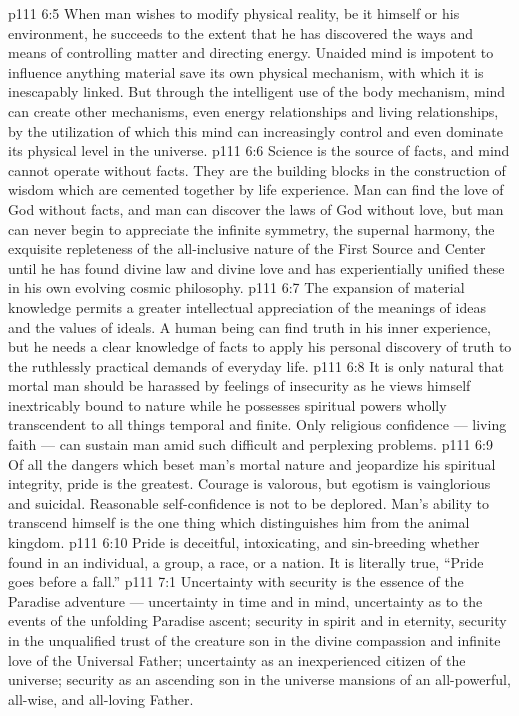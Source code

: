 \vs p111 6:5 When man wishes to modify physical reality, be it himself or his environment, he succeeds to the extent that he has discovered the ways and means of controlling matter and directing energy. Unaided mind is impotent to influence anything material save its own physical mechanism, with which it is inescapably linked. But through the intelligent use of the body mechanism, mind can create other mechanisms, even energy relationships and living relationships, by the utilization of which this mind can increasingly control and even dominate its physical level in the universe.
\vs p111 6:6 Science is the source of facts, and mind cannot operate without facts. They are the building blocks in the construction of wisdom which are cemented together by life experience. Man can find the love of God without facts, and man can discover the laws of God without love, but man can never begin to appreciate the infinite symmetry, the supernal harmony, the exquisite repleteness of the all\hyp{}inclusive nature of the First Source and Center until he has found divine law and divine love and has experientially unified these in his own evolving cosmic philosophy.
\vs p111 6:7 The expansion of material knowledge permits a greater intellectual appreciation of the meanings of ideas and the values of ideals. A human being can find truth in his inner experience, but he needs a clear knowledge of facts to apply his personal discovery of truth to the ruthlessly practical demands of everyday life.
\vs p111 6:8 \pc It is only natural that mortal man should be harassed by feelings of insecurity as he views himself inextricably bound to nature while he possesses spiritual powers wholly transcendent to all things temporal and finite. Only religious confidence --- living faith --- can sustain man amid such difficult and perplexing problems.
\vs p111 6:9 \pc Of all the dangers which beset man’s mortal nature and jeopardize his spiritual integrity, pride is the greatest. Courage is valorous, but egotism is vainglorious and suicidal. Reasonable self\hyp{}confidence is not to be deplored. Man’s ability to transcend himself is the one thing which distinguishes him from the animal kingdom.
\vs p111 6:10 \pc Pride is deceitful, intoxicating, and sin\hyp{}breeding whether found in an individual, a group, a race, or a nation. It is literally true, “Pride goes before a fall.”
\vs p111 7:1 Uncertainty with security is the essence of the Paradise adventure --- uncertainty in time and in mind, uncertainty as to the events of the unfolding Paradise ascent; security in spirit and in eternity, security in the unqualified trust of the creature son in the divine compassion and infinite love of the Universal Father; uncertainty as an inexperienced citizen of the universe; security as an ascending son in the universe mansions of an all\hyp{}powerful, all\hyp{}wise, and all\hyp{}loving Father.
